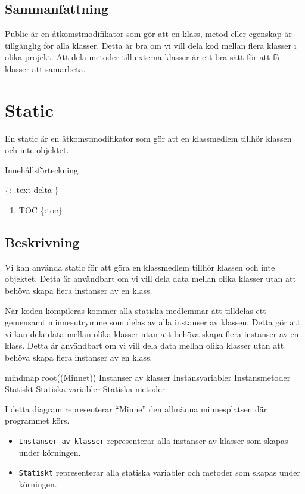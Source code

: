 \hypertarget{sammanfattning}{%
\subsection{Sammanfattning}\label{sammanfattning}}

Public är en åtkomstmodifikator som gör att en klass, metod eller
egenskap är tillgänglig för alla klasser. Detta är bra om vi vill dela
kod mellan flera klasser i olika projekt. Att dela metoder till externa
klasser är ett bra sätt för att få klasser att samarbeta.

\hypertarget{static}{%
\section{Static}\label{static}}

En static är en åtkomstmodifikator som gör att en klassmedlem tillhör
klassen och inte objektet.

Innehållsförteckning

\{: .text-delta \}

\begin{enumerate}
\def\labelenumi{\arabic{enumi}.}
\tightlist
\item
  TOC \{:toc\}
\end{enumerate}

\hypertarget{beskrivning}{%
\subsection{Beskrivning}\label{beskrivning}}

Vi kan använda static för att göra en klassmedlem tillhör klassen och
inte objektet. Detta är användbart om vi vill dela data mellan olika
klasser utan att behöva skapa flera instanser av en klass.

När koden kompileras kommer alla statiska medlemmar att tilldelas ett
gemensamt minnesutrymme som delas av alla instanser av klassen. Detta
gör att vi kan dela data mellan olika klasser utan att behöva skapa
flera instanser av en klass. Detta är användbart om vi vill dela data
mellan olika klasser utan att behöva skapa flera instanser av en klass.

mindmap root((Minnet)) Instanser av klasser Instansvariabler
Instansmetoder Statiskt Statiska variabler Statiska metoder

I detta diagram representerar ``Minne'' den allmänna minnesplatsen där
programmet körs.

\begin{itemize}
\tightlist
\item
  \texttt{Instanser\ av\ klasser} representerar alla instanser av
  klasser som skapas under körningen.
\item
  \texttt{Statiskt} representerar alla statiska variabler och metoder
  som skapas under körningen.
\end{itemize}

